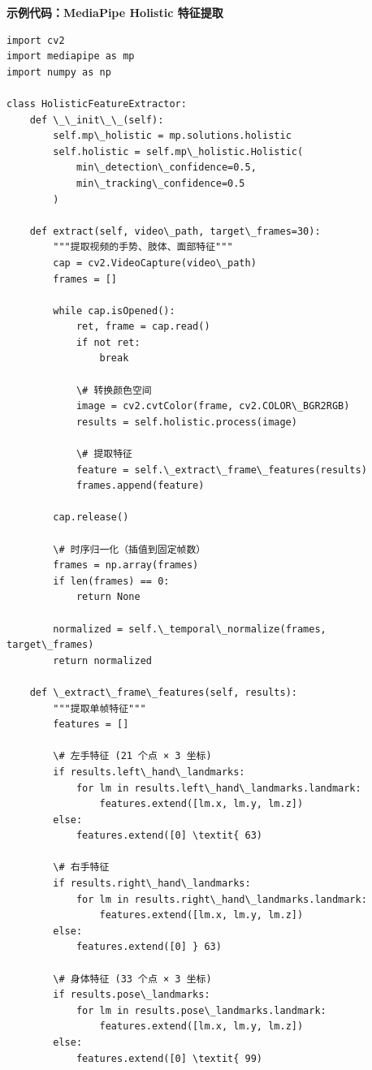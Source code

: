 \documentclass[a4paper,12pt]{article}
\begin{document}
\textbf{示例代码：MediaPipe Holistic 特征提取}

\begin{verbatim}
import cv2
import mediapipe as mp
import numpy as np

class HolisticFeatureExtractor:
    def \_\_init\_\_(self):
        self.mp\_holistic = mp.solutions.holistic
        self.holistic = self.mp\_holistic.Holistic(
            min\_detection\_confidence=0.5,
            min\_tracking\_confidence=0.5
        )
    
    def extract(self, video\_path, target\_frames=30):
        """提取视频的手势、肢体、面部特征"""
        cap = cv2.VideoCapture(video\_path)
        frames = []
        
        while cap.isOpened():
            ret, frame = cap.read()
            if not ret:
                break
            
            \# 转换颜色空间
            image = cv2.cvtColor(frame, cv2.COLOR\_BGR2RGB)
            results = self.holistic.process(image)
            
            \# 提取特征
            feature = self.\_extract\_frame\_features(results)
            frames.append(feature)
        
        cap.release()
        
        \# 时序归一化（插值到固定帧数）
        frames = np.array(frames)
        if len(frames) == 0:
            return None
        
        normalized = self.\_temporal\_normalize(frames, target\_frames)
        return normalized
    
    def \_extract\_frame\_features(self, results):
        """提取单帧特征"""
        features = []
        
        \# 左手特征 (21 个点 × 3 坐标)
        if results.left\_hand\_landmarks:
            for lm in results.left\_hand\_landmarks.landmark:
                features.extend([lm.x, lm.y, lm.z])
        else:
            features.extend([0] \textit{ 63)
        
        \# 右手特征
        if results.right\_hand\_landmarks:
            for lm in results.right\_hand\_landmarks.landmark:
                features.extend([lm.x, lm.y, lm.z])
        else:
            features.extend([0] } 63)
        
        \# 身体特征 (33 个点 × 3 坐标)
        if results.pose\_landmarks:
            for lm in results.pose\_landmarks.landmark:
                features.extend([lm.x, lm.y, lm.z])
        else:
            features.extend([0] \textit{ 99)
        

\end{verbatim}
\end{document}
